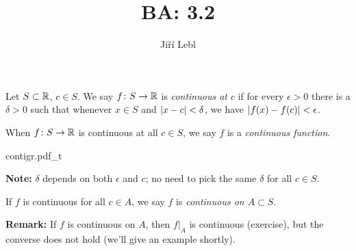 \documentclass[10pt,aspectratio=169]{beamer}
\author{Ji\v{r}\'i Lebl}
\institute[OSU]{%
Departemento pri Matematiko de Oklahoma {\^S}tata Universitato}
\title{BA: 3.2}
\date{}
\begin{document}
\begin{frame}
\titlepage
\end{frame}

\begin{frame}
\begin{definition}
Let $S \subset {\mathbb{R}}$, $c \in S$.  We say $f \colon S \to {\mathbb{R}}$ is
\emph{continuous at $c$} if for every $\epsilon > 0$
there is a $\delta > 0$ such that whenever $x \in S$ and $\left\lvert {x-c} \right\rvert <
\delta$, we have
$\left\lvert {f(x)-f(c)} \right\rvert < \epsilon$.

\pause

When $f \colon S \to {\mathbb{R}}$ is continuous at all $c \in S$, we say
$f$ is a \emph{continuous function}.
\end{definition}

\pause
\begin{center}
{contigr.pdf_t}
\end{center}

\pause
\textbf{Note:} $\delta$ 
depends on both $\epsilon$ and $c$; no need to pick
the same $\delta$ for all $c \in S$.

\pause
\medskip

If $f$ is continuous for all $c \in A$, we say $f$ is \emph{continuous on $A \subset S$}.

\pause
\medskip

\textbf{Remark:}
If $f$ is continuous on $A$, then $f|_A$ is continuous (exercise),
but the converse does not hold (we'll give an example shortly).

\end{frame}
\end{document}
